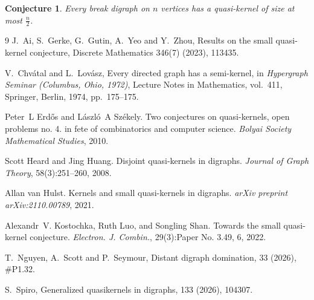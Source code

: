 \documentclass[11pt,a4paper]{article}
\newtheorem{conjecture}[theorem]{Conjecture}
\begin{document}
\begin{conjecture}
Every break digraph on \(n\) vertices has a quasi-kernel of size at most
\(\frac n2\).
\end{conjecture}
\begin{thebibliography}{9}
J.~Ai, S.~Gerke, G.~Gutin, A.~Yeo and Y.~Zhou,
Results on the small quasi-kernel conjecture,
Discrete Mathematics 346(7) (2023), 113435.

V.~Chv\'atal and L.~Lov\'asz,
\newblock Every directed graph has a semi-kernel,
\newblock in {\em Hypergraph Seminar (Columbus, Ohio, 1972)}, 
Lecture Notes in Mathematics, vol.~411, Springer, Berlin, 1974, pp.~175--175.

Peter~L Erd{\H{o}}s and L{\'a}szl{\'o}~A Sz{\'e}kely.
  Two conjectures on quasi-kernels, open problems no. 4. in fete of
  combinatorics and computer science.
  {\em Bolyai Society Mathematical Studies}, 2010.

Scott Heard and Jing Huang.
  Disjoint quasi-kernels in digraphs.
  {\em Journal of Graph Theory}, 58(3):251--260, 2008.

Allan van Hulst.
  Kernels and small quasi-kernels in digraphs.
  {\em arXiv preprint arXiv:2110.00789}, 2021.

Alexandr~V. Kostochka, Ruth Luo, and Songling Shan.
  Towards the small quasi-kernel conjecture.
  {\em Electron. J. Combin.}, 29(3):Paper No. 3.49, 6, 2022.

T.~Nguyen, A.~Scott and P.~Seymour,
\newblock Distant digraph domination,
 33 (2026), \#P1.32.

S.~Spiro,
\newblock Generalized quasikernels in digraphs,
 133 (2026), 104307.






\end{thebibliography}
\end{document}
